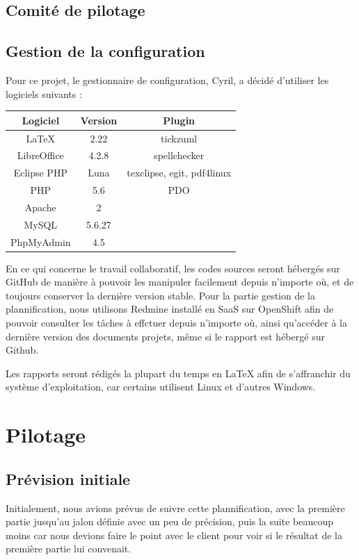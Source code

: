 \documentclass[11pt]{report}
\begin{document}
\subsection{Comité de pilotage}

\subsection{Gestion de la configuration}
Pour ce projet, le gestionnaire de configuration, Cyril, a décidé d'utiliser
les logiciels suivants : \\ 
\par 
\begin{tabular}{ | c | c | c | }
\hline 
   Logiciel & Version & Plugin  \\ \hline 
   LaTeX & 2.22 & tickzuml \\ \hline 
   LibreOffice & 4.2.8 & spellchecker \\ \hline 
   Eclipse PHP & Luna & texclipse, egit, pdf4linux \\ \hline
   PHP & 5.6 & PDO \\ \hline
   Apache & 2 & \\ \hline
   MySQL & 5.6.27 & \\ \hline
   PhpMyAdmin & 4.5 & \\ \hline
 \end{tabular}
 
 \par En ce qui concerne le travail collaboratif, les codes sources seront
 hébergés sur GitHub de manière à pouvoir les manipuler facilement depuis
 n'importe où, et de toujours conserver la dernière version stable. Pour la
 partie gestion de la plannification, nous utilisons Redmine installé en SaaS
 sur OpenShift afin de pouvoir consulter les tâches à effctuer depuis n'importe
 où, ainsi qu'accéder à la dernière version des documents projets, même si le
 rapport est hébergé sur Github.
 \par Les rapports seront rédigés la plupart du temps en LaTeX afin de
 s'affranchir du système d'exploitation, car certains utilisent Linux et
 d'autres Windows. 

\section{Pilotage}
\subsection{Prévision initiale}
Initialement, nous avions prévus de suivre cette plannification, avec la
première partie jusqu'au jalon définie avec un peu de précision, puis la suite
beaucoup moins car nous devions faire le point avec le client pour voir si le
résultat de la première partie lui convenait.
\par

 \begin{landscape}
   
\end{landscape}
\clearpage
\end{document}
